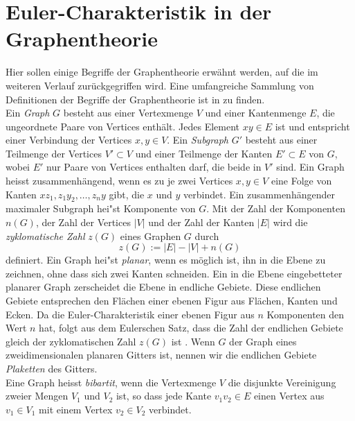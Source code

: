 \section{Euler-Charakteristik in der Graphentheorie}
\label{sec:graphen}
Hier sollen einige Begriffe der Graphentheorie erw\"ahnt werden, auf die im weiteren Verlauf zur\"uckgegriffen wird. Eine umfangreiche Sammlung von Definitionen der Begriffe der Graphentheorie ist in \cite{Essam:70} zu finden. \\
Ein \textit{Graph} $G$ besteht aus einer Vertexmenge $V$ und einer Kantenmenge $E$, die ungeordnete Paare von Vertices enth\"alt. Jedes Element $xy\in E$ ist und entspricht einer Verbindung der Vertices $x,y\in V$. Ein \textit{Subgraph} $G'$ besteht aus einer Teilmenge der Vertices $V'\subset V$ und einer Teilmenge der Kanten $E' \subset E$ von $G$, wobei $E'$ nur Paare von Vertices enthalten darf, die beide in $V'$ sind. Ein Graph heisst zusammenh\"angend, wenn es zu je zwei Vertices $x,y\in V$ eine Folge von Kanten $xz_1,z_1y_2,\ldots,z_ny$ gibt, die $x$ und $y$ verbindet. Ein zusammenh\"angender maximaler Subgraph hei"st Komponente von $G$. Mit der Zahl der Komponenten $n(G)$, der Zahl der Vertices $|V|$ und der Zahl der Kanten $|E|$ wird die \textit{zyklomatische Zahl} $z(G)$ eines Graphen $G$ durch
\begin{equation}
  z(G):=|E|-|V|+n(G)
\end{equation}
definiert. Ein Graph hei"st \textit{planar}, wenn es m\"oglich ist, ihn in die Ebene zu zeichnen, ohne dass sich zwei Kanten schneiden. Ein in die Ebene eingebetteter planarer Graph zerscheidet die Ebene in endliche Gebiete. Diese endlichen Gebiete entsprechen den Fl\"achen einer ebenen Figur aus Fl\"achen, Kanten und Ecken. Da die Euler-Charakteristik einer ebenen Figur aus $n$ Komponenten den Wert $n$ hat, folgt aus dem Eulerschen Satz, dass die Zahl der endlichen Gebiete gleich der zyklomatischen Zahl $z(G)$ ist \cite{Essam:70}. Wenn $G$ der Graph eines zweidimensionalen planaren Gitters ist, nennen wir die endlichen Gebiete \textit{Plaketten} des Gitters. 
\\Eine Graph heisst \textit{bibartit}, wenn die Vertexmenge $V$ die disjunkte Vereinigung zweier Mengen $V_1$ und $V_2$ ist, so dass jede Kante $v_1v_2\in E$ einen Vertex aus $v_1\in V_1$ mit einem Vertex $v_2 \in V_2$ verbindet.



